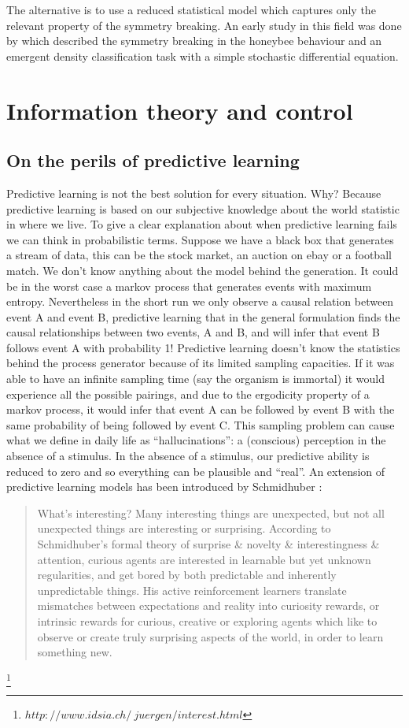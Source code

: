 The alternative is to use a reduced statistical model which captures
only the relevant property of the symmetry breaking.
An early study in this field was done by \citep{Hamann2010:modelsimmetry} which described
the symmetry breaking in the honeybee behaviour and an emergent
density classification task with a simple stochastic differential equation.

\section{Information theory and control \label{Conclusion:Thoughts}}


\subsection{On the perils of predictive learning}
Predictive learning is not the best solution for every situation. Why?
Because predictive learning is based on our subjective knowledge about the
world statistic in where we live. To give a clear explanation about when predictive
 learning fails we can think in probabilistic terms. Suppose we have a black box
that generates a stream of data, this can be the stock market, an auction on ebay
 or a football match. We don't know anything about the model behind the generation.
It could be in the worst case a markov process that generates events with maximum
 entropy. Nevertheless in the short run we only observe a causal relation between
 event A and event B, predictive learning that in the general formulation finds
the causal relationships between two events, A and B, and will infer that event B follows
 event A with probability 1! Predictive learning doesn't know the statistics behind
 the process generator because of its limited sampling capacities. If it was able
 to have an infinite sampling time (say the organism is immortal) it would experience
 all the possible pairings, and due to the ergodicity property of a markov process,
 it would infer that event A can be followed by event B with the same probability
 of being followed by event C.
This sampling problem can cause what we define in daily life as “hallucinations”:
a (conscious) perception in the absence of a stimulus.
In the absence of a stimulus, our predictive ability is reduced to zero and so everything
can be plausible and ``real''.
An extension of predictive learning models has been introduced by Schmidhuber \citep{Schuber2010:Novelty}:
\begin{quotation}
What's interesting? Many interesting things are unexpected, but not all unexpected
things are interesting or surprising. According to Schmidhuber's formal theory of
surprise \& novelty \& interestingness \& attention, curious agents are interested
in learnable but yet unknown regularities, and get bored by both predictable and
 inherently unpredictable things. His active reinforcement learners translate
mismatches between expectations and reality into curiosity rewards, or intrinsic
rewards for curious, creative or exploring agents which like to observe or create
truly surprising aspects of the world, in order to learn something new.
\end{quotation} \footnote{$http://www.idsia.ch/~juergen/interest.html$}
